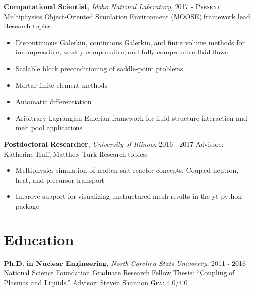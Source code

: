 \documentclass[a4paper,10pt]{article} %
\begin{document}
\textbf{Computational Scientist}, \textit{Idaho National Laboratory}, \textsc{2017 - Present}\newline
\hspace*{0.5em}Multiphysics Object-Oriented Simulation Environment (MOOSE) framework lead\newline
\hspace*{0.5em}Research topics:
  \begin{itemize}
  \item Discontinuous Galerkin, continuous Galerkin, and finite volume methods for incompressible, weakly compressible, and fully compressible fluid flows
  \item Scalable block preconditioning of saddle-point problems
  \item Mortar finite element methods
  \item Automatic differentiation
  \item Aribitrary Lagrangian-Eulerian framework for fluid-structure interaction and melt pool applications
  \end{itemize}


\textbf{Postdoctoral Researcher}, \textit{University of Illinois}, \textsc{2016 - 2017}\newline
\hspace*{0.5em}Advisors: Katherine Huff, Matthew Turk\newline
\hspace*{0.5em}Research topics:
  \begin{itemize}
  \item Multiphysics simulation of molten salt reactor concepts. Coupled neutron, heat, and precursor transport
  \item Improve support for visualizing unstructured mesh results in the yt python package
  \end{itemize}


\section{Education}

\textbf{Ph.D. in Nuclear Engineering}, \textit{North Carolina State University}, \textsc{2011 - 2016}\newline
\hspace*{0.5em}National Science Foundation Graduate Research Fellow\newline
\hspace*{0.5em}Thesis: ``Coupling of Plasmas and Liquids.''\newline
\hspace*{0.5em}Advisor: Steven Shannon\newline
\hspace*{0.5em}\textsc{Gpa}: 4.0/4.0\newline
\end{document}
